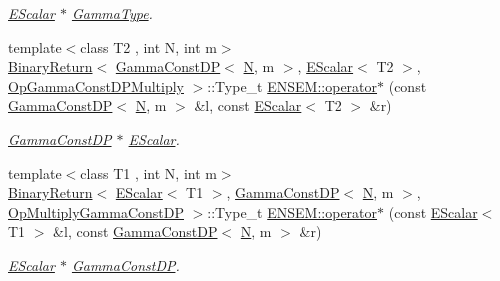 \begin{DoxyCompactItemize}
\begin{DoxyCompactList}\small\item\em \mbox{\hyperlink{classENSEM_1_1EScalar}{E\+Scalar}} $\ast$ \mbox{\hyperlink{classENSEM_1_1GammaType}{Gamma\+Type}}. \end{DoxyCompactList}\item 
{\footnotesize template$<$class T2 , int N, int m$>$ }\\\mbox{\hyperlink{structENSEM_1_1BinaryReturn}{Binary\+Return}}$<$ \mbox{\hyperlink{classENSEM_1_1GammaConstDP}{Gamma\+Const\+DP}}$<$ \mbox{\hyperlink{adat__devel_2lib_2hadron_2operator__name__util_8cc_a7722c8ecbb62d99aee7ce68b1752f337}{N}}, m $>$, \mbox{\hyperlink{classENSEM_1_1EScalar}{E\+Scalar}}$<$ T2 $>$, \mbox{\hyperlink{structENSEM_1_1OpGammaConstDPMultiply}{Op\+Gamma\+Const\+D\+P\+Multiply}} $>$\+::Type\+\_\+t \mbox{\hyperlink{group__escalar_ga37b9d878f5157952ec965d47a1032bc0}{E\+N\+S\+E\+M\+::operator$\ast$}} (const \mbox{\hyperlink{classENSEM_1_1GammaConstDP}{Gamma\+Const\+DP}}$<$ \mbox{\hyperlink{adat__devel_2lib_2hadron_2operator__name__util_8cc_a7722c8ecbb62d99aee7ce68b1752f337}{N}}, m $>$ \&l, const \mbox{\hyperlink{classENSEM_1_1EScalar}{E\+Scalar}}$<$ T2 $>$ \&r)
\begin{DoxyCompactList}\small\item\em \mbox{\hyperlink{classENSEM_1_1GammaConstDP}{Gamma\+Const\+DP}} $\ast$ \mbox{\hyperlink{classENSEM_1_1EScalar}{E\+Scalar}}. \end{DoxyCompactList}\item 
{\footnotesize template$<$class T1 , int N, int m$>$ }\\\mbox{\hyperlink{structENSEM_1_1BinaryReturn}{Binary\+Return}}$<$ \mbox{\hyperlink{classENSEM_1_1EScalar}{E\+Scalar}}$<$ T1 $>$, \mbox{\hyperlink{classENSEM_1_1GammaConstDP}{Gamma\+Const\+DP}}$<$ \mbox{\hyperlink{adat__devel_2lib_2hadron_2operator__name__util_8cc_a7722c8ecbb62d99aee7ce68b1752f337}{N}}, m $>$, \mbox{\hyperlink{structENSEM_1_1OpMultiplyGammaConstDP}{Op\+Multiply\+Gamma\+Const\+DP}} $>$\+::Type\+\_\+t \mbox{\hyperlink{group__escalar_gaa60096d471282c83dab865d42b53ce96}{E\+N\+S\+E\+M\+::operator$\ast$}} (const \mbox{\hyperlink{classENSEM_1_1EScalar}{E\+Scalar}}$<$ T1 $>$ \&l, const \mbox{\hyperlink{classENSEM_1_1GammaConstDP}{Gamma\+Const\+DP}}$<$ \mbox{\hyperlink{adat__devel_2lib_2hadron_2operator__name__util_8cc_a7722c8ecbb62d99aee7ce68b1752f337}{N}}, m $>$ \&r)
\begin{DoxyCompactList}\small\item\em \mbox{\hyperlink{classENSEM_1_1EScalar}{E\+Scalar}} $\ast$ \mbox{\hyperlink{classENSEM_1_1GammaConstDP}{Gamma\+Const\+DP}}. \end{DoxyCompactList}\item 

\end{DoxyCompactItemize}
